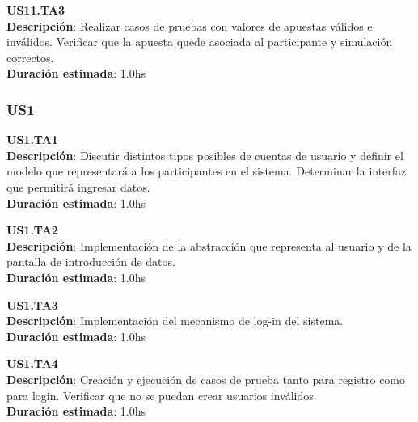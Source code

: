 \begin{tcolorbox}
\textbf{US11.TA3} \\
\textbf{Descripción}: Realizar casos de pruebas con valores de apuestas válidos e inválidos. Verificar que la apuesta quede asociada al participante y simulación correctos.\\
\textbf{Duración estimada}: 1.0hs
\end{tcolorbox}
\vspace{10pt}



\subsubsection*{\underline{US1}}

\begin{tcolorbox}
\textbf{US1.TA1} \\
\textbf{Descripción}: Discutir distintos tipos posibles de cuentas de usuario y definir el modelo que representará a los participantes en el sistema. Determinar la interfaz que permitirá ingresar datos.\\
\textbf{Duración estimada}: 1.0hs
\end{tcolorbox}
\vspace{10pt}

\begin{tcolorbox}
\textbf{US1.TA2} \\
\textbf{Descripción}: Implementación de la abstracción que representa al usuario y de la pantalla de introducción de datos.\\
\textbf{Duración estimada}: 1.0hs
\end{tcolorbox}
\vspace{10pt}

\begin{tcolorbox}
\textbf{US1.TA3} \\
\textbf{Descripción}: Implementación del mecanismo de log-in del sistema.\\
\textbf{Duración estimada}: 1.0hs
\end{tcolorbox}
\vspace{10pt}

\begin{tcolorbox}
\textbf{US1.TA4} \\
\textbf{Descripción}: Creación y ejecución de casos de prueba tanto para registro como para login. Verificar que no se puedan crear usuarios inválidos. \\
\textbf{Duración estimada}: 1.0hs
\end{tcolorbox}
\vspace{10pt}

